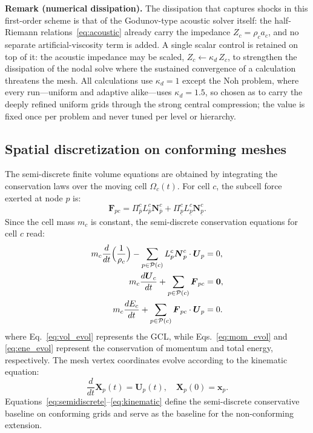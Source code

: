 \documentclass[a4paper]{cas-sc}
\begin{document}
\par\medskip\noindent\textbf{Remark (numerical dissipation).}
The dissipation that captures shocks in this first-order scheme is that of the
Godunov-type acoustic solver itself: the half-Riemann relations~\eqref{eq:acoustic}
already carry the impedance $Z_c=\rho_ca_c$, and no separate artificial-viscosity
term is added. A single scalar control is retained on top of it: the acoustic
impedance may be scaled, $Z_c\leftarrow\kappa_d\,Z_c$, to strengthen the dissipation
of the nodal solve where the sustained convergence of a calculation threatens the
mesh. All calculations use $\kappa_d=1$ except the Noh problem, where every
run---uniform and adaptive alike---uses $\kappa_d=1.5$, so chosen as to carry the
deeply refined uniform grids through the strong central compression; the value is
fixed once per problem and never tuned per level or hierarchy.

\subsection{Spatial discretization on conforming meshes}

The semi-discrete finite volume equations are obtained by integrating the conservation laws over the moving cell $\Omega_c(t)$. For cell $c$, the subcell force exerted at node $p$ is:
\begin{equation}
\boldsymbol{F}_{pc} = \Pi_{\overline{p}}^c L_{\overline{p}}^c \boldsymbol{N}_{\overline{p}}^c + \Pi_{\underline{p}}^c L_{\underline{p}}^c \boldsymbol{N}_{\underline{p}}^c.
	\label{eq:Fcp}
\end{equation}
Since the cell mass $m_c$ is constant, the semi-discrete conservation equations for cell $c$ read:
\begin{subequations}
	\begin{align}
		m_c\frac{d}{dt}\Bigl(\frac{1}{\rho_{c}}\Bigr) - \sum_{p \in \mathcal{P}(c)} L_{p}^c \boldsymbol{N}_{p}^c \cdot \boldsymbol{U}_p &= 0, \label{eq:vol_evol}\\
m_c \frac{d\boldsymbol{U}_c}{dt} + \sum_{p \in \mathcal{P}(c)} \boldsymbol{F}_{pc} &= \boldsymbol{0}, \label{eq:mom_evol}\\
m_c \frac{dE_c}{dt} + \sum_{p \in \mathcal{P}(c)} \boldsymbol{F}_{pc} \cdot \boldsymbol{U}_p &= 0. \label{eq:ene_evol}
	\end{align}
	\label{eq:semidiscrete}
\end{subequations}
where Eq.~\eqref{eq:vol_evol} represents the GCL, while Eqs.~\eqref{eq:mom_evol} and \eqref{eq:ene_evol} represent the conservation of momentum and total energy, respectively. The mesh vertex coordinates evolve according to the kinematic equation:
\begin{equation}
	\frac{d}{dt}\boldsymbol{X}_p(t) = \boldsymbol{U}_p(t), \quad \boldsymbol{X}_p(0) = \boldsymbol{x}_p.
	\label{eq:kinematic}
\end{equation}
Equations~\eqref{eq:semidiscrete}--\eqref{eq:kinematic} define the semi-discrete conservative baseline on conforming grids and serve as the baseline for the non-conforming extension.
\end{document}
